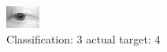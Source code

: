 \begin{figure}[h!]
\begin{center}
\includegraphics[width=0.60\columnwidth]{figures/ID2600_class_3_target_4.png}
\end{center}
\caption{ Classification: 3 actual target: 4}
\label{fig:ID2600_class_3_target_4}
\end{figure}
